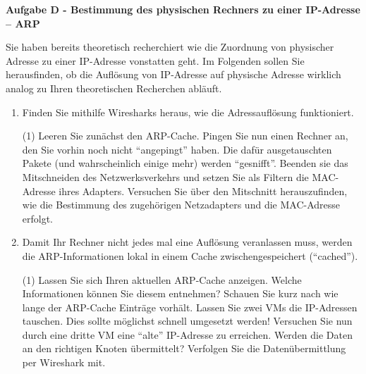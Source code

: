 \documentclass[paper=a4,fontsize=11pt]{scrartcl}%
\numberwithin{equation}{section}
\begin{document}
\begin{center}
\Large{\textbf{Aufgabe D - Bestimmung des physischen Rechners zu einer IP-Adresse -- ARP}}
\end{center}\vskip0.25in
Sie haben bereits theoretisch recherchiert wie die Zuordnung von physischer Adresse zu einer IP-Adresse vonstatten geht. Im Folgenden sollen Sie herausfinden, ob die Auflösung von IP-Adresse auf physische Adresse wirklich analog zu Ihren theoretischen Recherchen abläuft.
\begin{enumerate}
	\item Finden Sie mithilfe Wiresharks heraus, wie die Adressauflösung funktioniert.
		\begin{tasks}(1)
			\task Leeren Sie zunächst den ARP-Cache.
			\task Pingen Sie nun einen Rechner an, den Sie vorhin noch nicht \enquote{angepingt} haben. Die dafür ausgetauschten Pakete (und wahrscheinlich einige mehr) werden \enquote{gesnifft}.
			\task Beenden sie das Mitschneiden des Netzwerksverkehrs und setzen Sie als Filtern die MAC-Adresse ihres Adapters.
			\task Versuchen Sie über den Mitschnitt herauszufinden, wie die Bestimmung des zugehörigen Netzadapters und die MAC-Adresse erfolgt.
		\end{tasks}
	\item Damit Ihr Rechner nicht jedes mal eine Auflösung veranlassen muss, werden die ARP-Informationen lokal in einem Cache zwischengespeichert (\enquote{cached}).
\begin{tasks}(1)
	\task Lassen Sie sich Ihren aktuellen ARP-Cache anzeigen. Welche Informationen können Sie diesem entnehmen?
	\task Schauen Sie kurz nach wie lange der ARP-Cache Einträge vorhält.
	\task Lassen Sie zwei VMs die IP-Adressen tauschen. Dies sollte möglichst schnell umgesetzt werden!
	\task Versuchen Sie nun durch eine dritte VM eine \enquote{alte} IP-Adresse zu erreichen. Werden die Daten an den richtigen Knoten übermittelt?
	\task Verfolgen Sie die Datenübermittlung per Wireshark mit.
\end{tasks}
\end{enumerate}
\end{document}
